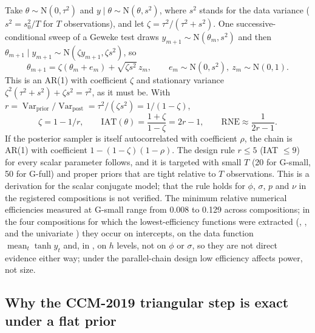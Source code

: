 Take $\theta \sim \mathrm{N}(0, \tau^2)$ and $y \mid \theta \sim \mathrm{N}(\theta, s^2)$, where $s^2$
stands for the data variance ($s^2 = s_0^2/T$ for $T$ observations), and let $\zeta =
\tau^2/(\tau^2 + s^2)$.
One successive-conditional sweep of a Geweke test draws $y_{m+1} \sim \mathrm{N}(\theta_m, s^2)$ and
then $\theta_{m+1} \mid y_{m+1} \sim \mathrm{N}(\zeta y_{m+1}, \zeta s^2)$, so
\begin{equation}\label{eq:sc-ar1}
\theta_{m+1} = \zeta(\theta_m + e_m) + \sqrt{\zeta s^2}\, z_m, \qquad e_m \sim \mathrm{N}(0,
s^2),\ z_m \sim \mathrm{N}(0, 1).
\end{equation}
This is an AR(1) with coefficient $\zeta$ and stationary variance $\zeta^2(\tau^2 + s^2) + \zeta
s^2 = \tau^2$, as it must be.
With $r = \operatorname{Var}_{\mathrm{prior}}/\operatorname{Var}_{\mathrm{post}} = \tau^2/(\zeta
s^2) = 1/(1-\zeta)$,
\begin{equation}\label{eq:iat}
\zeta = 1 - 1/r, \qquad \mathrm{IAT}(\theta) = \frac{1 + \zeta}{1 - \zeta} = 2r - 1, \qquad
\mathrm{RNE} \approx \frac{1}{2r - 1}.
\end{equation}
If the posterior sampler is itself autocorrelated with coefficient $\rho$, the chain is AR(1) with
coefficient $1 - (1 - \zeta)(1 - \rho)$.
The design rule $r \le 5$ (IAT $\le 9$) for every scalar parameter follows, and it is targeted with small
$T$ (20 for G-small, 50 for G-full) and proper priors that are tight relative to $T$ observations.
This is a derivation for the scalar conjugate model; that the rule holds for $\phi$, $\sigma$, $p$
and $\nu$ in the registered compositions is not verified.
The minimum relative numerical efficiencies measured at G-small range from 0.008 to 0.129 across
compositions; in the four compositions for which the lowest-efficiency functions were extracted
(, ,  and the univariate
) they occur on intercepts, on the data function $\operatorname{mean}_t\tanh y_t$ and,
in , on $h$ levels, not on $\phi$ or $\sigma$, so they are not direct evidence either
way; under the parallel-chain design low efficiency affects power, not size.

\subsection{Why the CCM-2019 triangular step is exact under a flat prior}\label{app:ccm-flat}

